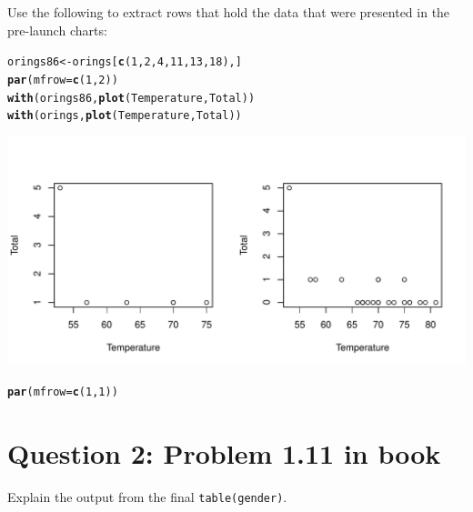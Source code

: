 \documentclass{article}\usepackage[]{graphicx}\usepackage[]{color}
\makeatletter
\def\maxwidth{ %
  \ifdim\Gin@nat@width>\linewidth
    \linewidth
  \else
    \Gin@nat@width
  \fi
}
\newcommand{\hlnum}[1]{\textcolor[rgb]{0.686,0.059,0.569}{#1}}%
\newcommand{\hlstd}[1]{\textcolor[rgb]{0.345,0.345,0.345}{#1}}%
\newcommand{\hlkwb}[1]{\textcolor[rgb]{0.69,0.353,0.396}{#1}}%
\newcommand{\hlkwc}[1]{\textcolor[rgb]{0.333,0.667,0.333}{#1}}%
\newcommand{\hlkwd}[1]{\textcolor[rgb]{0.737,0.353,0.396}{\textbf{#1}}}%
\newenvironment{kframe}{%
 \def\at@end@of@kframe{}%
 \ifinner\ifhmode%
  \def\at@end@of@kframe{\end{minipage}}%
  \begin{minipage}{\columnwidth}%
 \fi\fi%
 \def\FrameCommand##1{\hskip\@totalleftmargin \hskip-\fboxsep
 \colorbox{shadecolor}{##1}\hskip-\fboxsep
     \hskip-\linewidth \hskip-\@totalleftmargin \hskip\columnwidth}%
 \MakeFramed {\advance\hsize-\width
   \@totalleftmargin\z@ \linewidth\hsize
   \@setminipage}}%
 {\par\unskip\endMakeFramed%
 \at@end@of@kframe}
\newenvironment{knitrout}{}{} %
\makeatother
\begin{document}
Use the following to extract rows that hold the data that were presented in
the pre-launch charts:
\begin{knitrout}
\color{fgcolor}\begin{kframe}
\begin{alltt}
\hlstd{orings86} \hlkwb{<-} \hlstd{orings[}\hlkwd{c}\hlstd{(}\hlnum{1}\hlstd{,}\hlnum{2}\hlstd{,}\hlnum{4}\hlstd{,}\hlnum{11}\hlstd{,}\hlnum{13}\hlstd{,}\hlnum{18}\hlstd{), ]}
\hlkwd{par}\hlstd{(}\hlkwc{mfrow}\hlstd{=}\hlkwd{c}\hlstd{(}\hlnum{1}\hlstd{,} \hlnum{2}\hlstd{))}
\hlkwd{with}\hlstd{(orings86,} \hlkwd{plot}\hlstd{(Temperature, Total))}
\hlkwd{with}\hlstd{(orings,} \hlkwd{plot}\hlstd{(Temperature, Total))}
\end{alltt}
\end{kframe}

{\centering \includegraphics[width=\maxwidth]{figure/unnamed-chunk-2} 

}


\begin{kframe}\begin{alltt}
\hlkwd{par}\hlstd{(}\hlkwc{mfrow}\hlstd{=}\hlkwd{c}\hlstd{(}\hlnum{1}\hlstd{,} \hlnum{1}\hlstd{))}
\end{alltt}
\end{kframe}
\end{knitrout}

\section{Question 2: Problem 1.11 in book}

Explain the output from the final \verb!table(gender)!.
\end{document}
